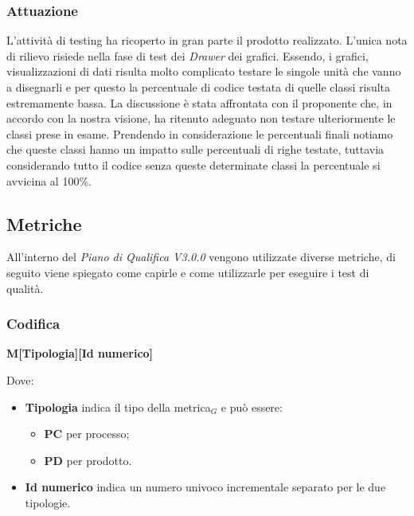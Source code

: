   \subsubsection{Attuazione}
  L'attività di testing ha ricoperto in gran parte il prodotto realizzato.
  \newline
  L'unica nota di rilievo risiede nella fase di test dei \textit{Drawer} dei grafici. Essendo, i grafici, visualizzazioni di dati risulta molto complicato testare le singole unità che vanno a disegnarli e per questo la percentuale di codice testata di quelle classi risulta estremamente bassa.
  \newline
  La discussione è stata affrontata con il proponente che, in accordo con la nostra visione, ha ritenuto adeguato non testare ulteriormente le classi prese in esame.
  \newline
  Prendendo in considerazione le percentuali finali notiamo che queste classi hanno un impatto sulle percentuali di righe testate, tuttavia considerando tutto il codice senza queste determinate classi la percentuale si avvicina al 100\%.


  \subsection{Metriche}\label{sec:Metriche}
  All'interno del \textit{Piano di Qualifica V3.0.0} vengono utilizzate diverse metriche, di seguito viene spiegato come capirle e come utilizzarle per
  eseguire i test di qualità.
  \subsubsection{Codifica}
  \begin{center}
      \textbf{M[Tipologia][Id numerico]}
  \end{center}
  Dove:
    \begin{itemize}
        \item \textbf{Tipologia} indica il tipo della metrica$_G$ e può essere:
                \begin{itemize}
                    \item \textbf{PC} per processo;
                    \item \textbf{PD} per prodotto.
                \end{itemize}
        \item \textbf{Id numerico} indica un numero univoco incrementale separato per le due tipologie.
    \end{itemize}

